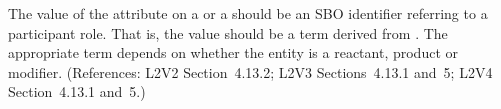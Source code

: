 The value of the  attribute on a \SpeciesReference or a
\ModifierSpeciesReference should be an SBO identifier referring to a
participant role.  That is, the value should be a term derived
from \sboparticipantrole.  The appropriate term depends on whether
the entity is a reactant, product or modifier.  (References: 
L2V2 Section~4.13.2; L2V3 Sections~4.13.1 and~5; L2V4 Section~4.13.1 and~5.)
